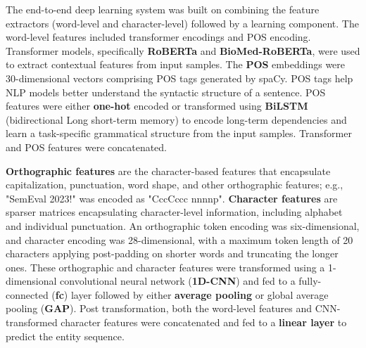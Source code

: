 \documentclass[11pt]{article}
\begin{document}
The end-to-end deep learning system was built on combining the feature extractors (word-level and character-level) followed by a learning component.
The word-level features included transformer encodings and POS encoding.
Transformer models, specifically \textbf{RoBERTa} and \textbf{BioMed-RoBERTa}, were used to extract contextual features from input samples.
The \textbf{POS} embeddings were 30-dimensional vectors comprising POS tags generated by spaCy. 
POS tags help NLP models better understand the syntactic structure of a sentence.
POS features were either \textbf{one-hot} encoded or transformed using \textbf{BiLSTM} (bidirectional Long short-term memory) to encode long-term dependencies and learn a task-specific grammatical structure from the input samples.
Transformer and POS features were concatenated. 



\textbf{Orthographic features} are the character-based features that encapsulate capitalization, punctuation, word shape, and other orthographic features; e.g., "SemEval 2023!" was encoded as "CccCccc nnnnp". 
\textbf{Character features} are sparser matrices encapsulating character-level information, including alphabet and individual punctuation.
An orthographic token encoding was six-dimensional, and character encoding was 28-dimensional, with a maximum token length of 20 characters applying post-padding on shorter words and truncating the longer ones.
These orthographic and character features were transformed using a 1-dimensional convolutional neural network (\textbf{1D-CNN}) and fed to a fully-connected (\textbf{fc}) layer followed by either \textbf{average pooling} or global average pooling (\textbf{GAP}).
Post transformation, both  the word-level features and CNN-transformed character features were concatenated and fed to a \textbf{linear layer} to predict the entity sequence.
\end{document}
